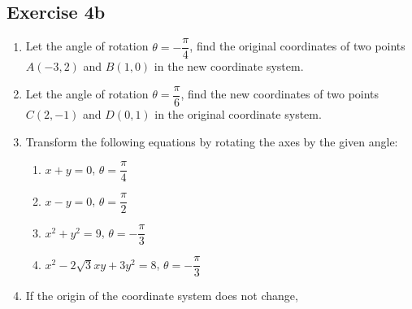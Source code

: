 \documentclass{report}
\begin{document}
\subsection*{Exercise 4b}
\begin{enumerate}[leftmargin=*]
    \item Let the angle of rotation $\theta = -\dfrac{\pi}{4}$, find the original
          coordinates of two points $A(-3, 2)$ and $B(1, 0)$ in the new coordinate
          system.
    \item Let the angle of rotation $\theta = \dfrac{\pi}{6}$, find the new coordinates
          of two points $C(2, -1)$ and $D(0, 1)$ in the original coordinate system.
    \item Transform the following equations by rotating the axes by the given angle:
          \begin{enumerate}
              \item $x + y = 0$, \qquad\qquad\qquad\hspace{1.4em} $\theta = \dfrac{\pi}{4}$
              \item $x - y = 0$, \qquad\qquad\qquad\hspace{1.4em} $\theta = \dfrac{\pi}{2}$
              \item $x^2 + y^2 = 9$, \qquad\qquad\qquad\hspace{0.7em}$\theta = -\dfrac{\pi}{3}$
              \item $x^2 - 2\sqrt{3}xy + 3y^2 = 8$, \qquad $\theta = -\dfrac{\pi}{3}$
          \end{enumerate}
    \item If the origin of the coordinate system does not change,
\end{enumerate}
\end{document}
